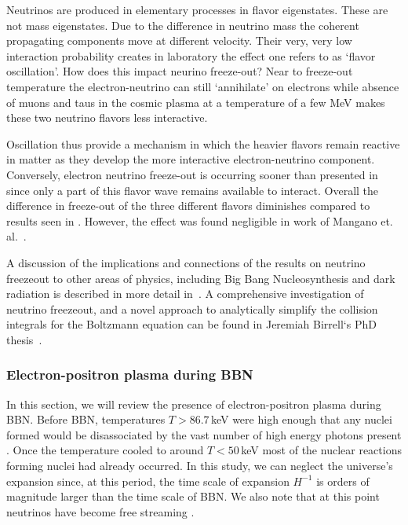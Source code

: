 
Neutrinos are produced in elementary processes in flavor eigenstates. These are not mass eigenstates. Due to the difference in neutrino mass the coherent propagating components move at different velocity. Their very, very low interaction probability creates in laboratory the effect one refers to as `flavor oscillation'. How does this impact neurino freeze-out? Near to freeze-out temperature the electron-neutrino can still `annihilate' on electrons while absence of muons and taus in the cosmic plasma at a temperature of a few MeV makes these two neutrino flavors less interactive. 

Oscillation thus provide a mechanism in which the heavier flavors remain reactive in matter as they develop the more interactive electron-neutrino component. Conversely, electron neutrino freeze-out is occurring sooner than presented in  since only a part of this flavor wave remains available to interact. Overall the difference in freeze-out of the three different flavors diminishes compared to results seen in . However, the effect was found negligible in work of Mangano et. al.~\cite{Mangano:2005cc}.

A discussion of the implications and connections of the results on neutrino freezeout to other areas of physics, including Big Bang Nucleosynthesis and dark radiation is described in more detail in~\cite{Dreiner:2011fp,Boehm:2012gr,Blennow:2012de,Birrell:2014uka}. A comprehensive investigation of neutrino freezeout, and a novel approach to analytically simplify the collision integrals for the Boltzmann equation can be found in Jeremiah Birrell‘s PhD thesis~\cite{Birrell:2014ona}. 

\subsubsection{Electron-positron plasma during BBN}\label{sec:density}
In this section, we will review the presence of electron-positron plasma during BBN. Before BBN, temperatures $T>86.7\,$keV were high enough that any nuclei formed would be disassociated by the vast number of high energy photons present \cite{Pitrou:2018cgg}. Once the temperature cooled to around $T<50\,$keV most of the nuclear reactions forming nuclei had already occurred. In this study, we can neglect the universe's expansion since, at this period, the time scale of expansion $H^{-1}$ is orders of magnitude larger than the time scale of BBN. We also note that at this point neutrinos have become free streaming \cite{Birrell:2012gg}.

